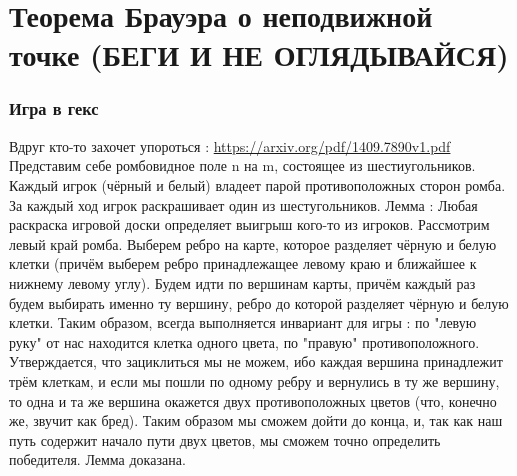 \documentclass[12pt, a4paper]{article}
\newcommand{\nl}{\newline}
\begin{document}
    \section{Теорема Брауэра о неподвижной точке (БЕГИ И НЕ ОГЛЯДЫВАЙСЯ)}
        \subsubsection{Игра в гекс}
        Вдруг кто-то захочет упороться : \url{https://arxiv.org/pdf/1409.7890v1.pdf} \nl
        Представим себе ромбовидное поле n на m, состоящее из шестиугольников. Каждый игрок (чёрный и белый) владеет парой противоположных сторон ромба. За каждый ход игрок раскрашивает один из шестугольников. \nl
        Лемма : Любая раскраска игровой доски определяет выигрыш кого-то из игроков. \nl
        Рассмотрим левый край ромба. Выберем ребро на карте, которое разделяет чёрную и белую клетки (причём выберем ребро принадлежащее левому краю и ближайшее к нижнему левому углу). Будем идти по вершинам карты, причём каждый раз будем выбирать именно ту вершину, ребро до которой разделяет чёрную и белую клетки. Таким образом, всегда выполняется инвариант для игры : по "левую руку" от нас находится клетка одного цвета, по "правую" противоположного. Утверждается, что зациклиться мы не можем, ибо каждая вершина принадлежит трём клеткам, и если мы пошли по одному ребру и вернулись в ту же вершину, то одна и та же вершина окажется двух противоположных цветов (что, конечно же, звучит как бред). Таким образом мы сможем дойти до конца, и, так как наш путь содержит начало пути двух цветов, мы сможем точно определить победителя. Лемма доказана. \nl
        
\end{document}
